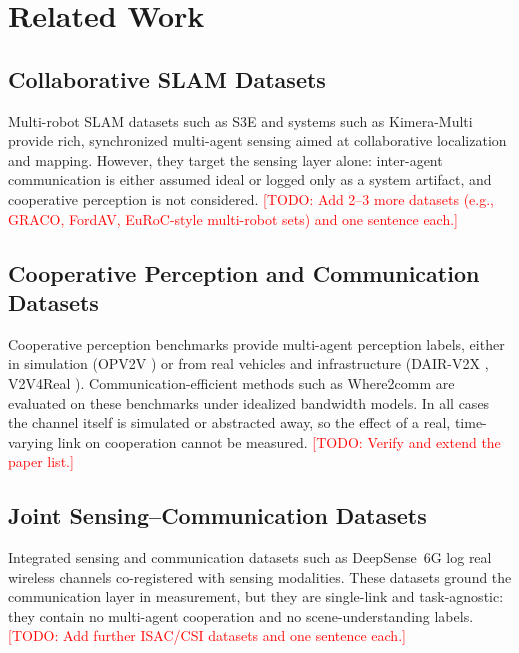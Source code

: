 \documentclass[conference]{IEEEtran}
\newcommand{\todo}[1]{\textcolor{red}{[TODO: #1]}}
\begin{document}
\section{Related Work}
\label{sec:related}

\subsection{Collaborative SLAM Datasets}
Multi-robot SLAM datasets such as S3E \cite{s3e} and systems such as
Kimera-Multi \cite{kimeramulti} provide rich, synchronized multi-agent
sensing aimed at collaborative localization and mapping. However, they
target the sensing layer alone: inter-agent communication is either assumed
ideal or logged only as a system artifact, and cooperative perception is not
considered. \todo{Add 2--3 more datasets (e.g., GRACO, FordAV, EuRoC-style
multi-robot sets) and one sentence each.}

\subsection{Cooperative Perception and Communication Datasets}
Cooperative perception benchmarks provide multi-agent perception labels,
either in simulation (OPV2V \cite{opv2v}) or from real vehicles and
infrastructure (DAIR-V2X \cite{dairv2x}, V2V4Real \cite{v2v4real}).
Communication-efficient methods such as Where2comm \cite{where2comm} are
evaluated on these benchmarks under idealized bandwidth models. In all
cases the channel itself is simulated or abstracted away, so the effect of
a real, time-varying link on cooperation cannot be measured.
\todo{Verify and extend the paper list.}

\subsection{Joint Sensing--Communication Datasets}
Integrated sensing and communication datasets such as DeepSense~6G
\cite{deepsense6g} log real wireless channels co-registered with sensing
modalities. These datasets ground the communication layer in measurement,
but they are single-link and task-agnostic: they contain no multi-agent
cooperation and no scene-understanding labels. \todo{Add further ISAC/CSI
datasets and one sentence each.}
\end{document}
